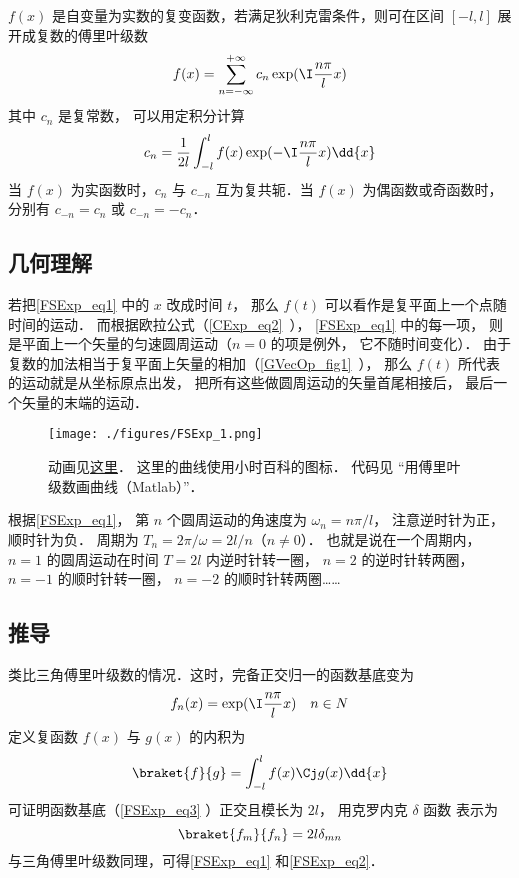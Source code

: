 
$f(x)$ 是自变量为实数的复变函数，若满足狄利克雷条件，则可在区间 $[- l,l]$ 展开成复数的傅里叶级数
\begin{equation}\label{FSExp_eq1}
f(x) = \sum_{n =  - \infty }^{ + \infty } c_n \exp ( \I\frac{n\pi }{l}x )
\end{equation}
其中 $c_n$ 是复常数， 可以用定积分计算
\begin{equation}\label{FSExp_eq2}
c_n = \frac{1}{2l} \int_{ - l}^l  f(x)\exp( -\I\frac{n\pi }{l}x ) \dd{x} 
\end{equation}
当 $f(x)$ 为实函数时，$c_n$ 与 $c_{-n}$ 互为复共轭．当 $f(x)$ 为偶函数或奇函数时，分别有 $c_{-n} = c_n$ 或 $c_{-n} = -c_n$．

\subsection{几何理解}
若把\autoref{FSExp_eq1} 中的 $x$ 改成时间 $t$， 那么 $f(t)$ 可以看作是复平面上一个点随时间的运动． 而根据欧拉公式（\autoref{CExp_eq2}~）， \autoref{FSExp_eq1} 中的每一项， 则是平面上一个矢量的匀速圆周运动（$n=0$ 的项是例外， 它不随时间变化）． 由于复数的加法相当于复平面上矢量的相加（\autoref{GVecOp_fig1}~）， 那么 $f(t)$ 所代表的运动就是从坐标原点出发， 把所有这些做圆周运动的矢量首尾相接后， 最后一个矢量的末端的运动．

\begin{figure}[ht]
\centering
\texttt{[image: ./figures/FSExp\_1.png]}
\caption{动画见\href{https://wuli.wiki/apps/FFTplt.html}{这里}． 这里的曲线使用小时百科的图标． 代码见 “用傅里叶级数画曲线（Matlab）”．} \label{FSExp_fig1}
\end{figure}

根据\autoref{FSExp_eq1}， 第 $n$ 个圆周运动的角速度为 $\omega_n = n\pi/l$， 注意逆时针为正， 顺时针为负． 周期为 $T_n = 2\pi/\omega = 2l/n$（$n\ne 0$）． 也就是说在一个周期内， $n=1$ 的圆周运动在时间 $T = 2l$ 内逆时针转一圈， $n=2$ 的逆时针转两圈， $n=-1$ 的顺时针转一圈， $n=-2$ 的顺时针转两圈……

\subsection{推导}
类比三角傅里叶级数的情况．这时，完备正交归一的函数基底变为
\begin{equation}\label{FSExp_eq3}
f_n(x) = \exp( \I\frac{n\pi }{l}x ) \quad{n \in N}
\end{equation} 
定义复函数 $f(x)$ 与 $g(x)$ 的内积为
\begin{equation}
\braket{f}{g} = \int_{-l}^{l}  f(x)\Cj g(x) \dd{x}
\end{equation}
可证明函数基底（\autoref{FSExp_eq3} ）正交且模长为 $2l$， 用克罗内克 $\delta$ 函数%
表示为
\begin{equation}\label{FSExp_eq4}
\braket{f_m}{f_n} = 2l \delta_{mn}
\end{equation}
与三角傅里叶级数同理，可得\autoref{FSExp_eq1} 和\autoref{FSExp_eq2}．

